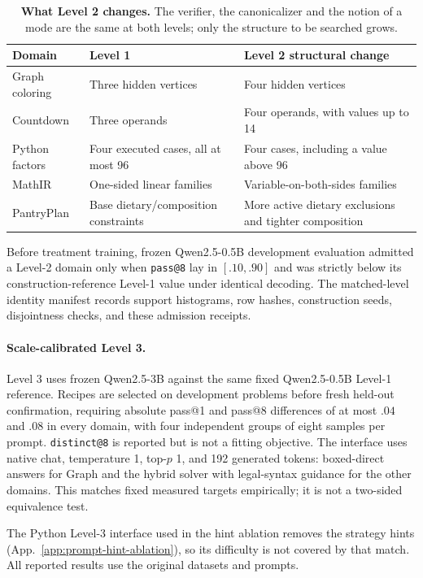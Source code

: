 \documentclass{article}
\makeatletter
\newcommand{\1}{\mathbf 1}
\newcommand{\distk}{\texttt{distinct@8}}
\theoremstyle{remark}
\theoremstyle{definition}
\theoremstyle{plain}
\makeatother
\begin{document}
\begin{table}[!htbp]
\centering
\caption{\textbf{What Level 2 changes.} The verifier, the canonicalizer and the
notion of a mode are the same at both levels; only the structure to be searched
grows.}
\label{tab:level2-structure}
\small
\begin{tabularx}{.96\linewidth}{@{}lYY@{}}
\toprule
\textbf{Domain} & \textbf{Level 1} & \textbf{Level 2 structural change} \\
\midrule
Graph coloring & Three hidden vertices & Four hidden vertices \\
Countdown & Three operands & Four operands, with values up to 14 \\
Python factors & Four executed cases, all at most 96 & Four cases, including a value above 96 \\
MathIR & One-sided linear families & Variable-on-both-sides families \\
PantryPlan & Base dietary/composition constraints & More active dietary exclusions and tighter composition \\
\bottomrule
\end{tabularx}
\end{table}

Before treatment training, frozen Qwen2.5-0.5B development evaluation admitted
a Level-2 domain only when \texttt{pass@8} lay in $[.10,.90]$ and was strictly below
its construction-reference Level-1 value under identical decoding. The matched-level
identity manifest records support histograms, row hashes, construction
seeds, disjointness checks, and these admission receipts.


\paragraph{Scale-calibrated Level 3.}
Level 3 uses frozen Qwen2.5-3B against the same fixed Qwen2.5-0.5B Level-1
reference. Recipes are selected on development problems before fresh held-out
confirmation, requiring absolute pass@1 and pass@8 differences of at most
$.04$ and $.08$ in every domain, with four independent groups of eight samples
per prompt. \distk{} is reported but is not a fitting objective. The
interface uses native chat, temperature 1, top-$p$ 1, and 192 generated
tokens: boxed-direct answers for Graph and the hybrid solver with
legal-syntax guidance for the other domains. This matches fixed measured
targets empirically; it is not a two-sided equivalence test.

The Python Level-3 interface used in the hint ablation removes the strategy
hints (App.~\ref{app:prompt-hint-ablation}), so its difficulty is not
covered by that match. All reported results use the original datasets and
prompts.
\end{document}
